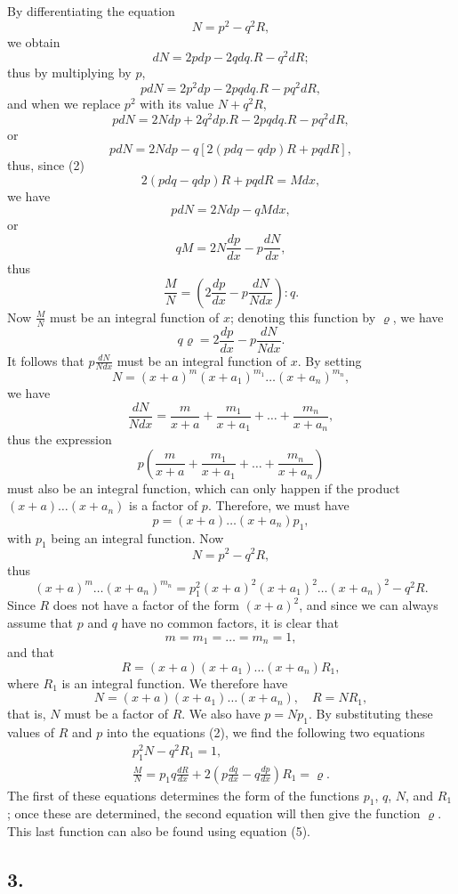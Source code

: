 \documentclass[oneside, 12 pt, leqno]{memoir}
\begin{document}
By differentiating the equation
\[N=p^2-q^2 R,\]
we obtain
\[d N=2 p d p-2 q d q. R-q^2 d R;\]
thus by multiplying by \(p\),
\[p d N=2 p^2 d p-2 p q d q. R- pq^2 d R,\]
and when we replace \(p^2\) with its value \(N+q^2 R\),
\[p d N=2 N d p+2 q^2 d p. R-2 p q d q. R-p q^2 d R,\]
or
\[p d N=2 N d p-q[2(p d q-q d p) R+p q d R],\]
thus, since (2)
\[2(p d q-q d p) R+p q d R=M d x,\]
we have
\[p d N=2 N d p-q M d x,\]
or
\[q M=2 N \frac{d p}{d x}-p \frac{d N}{d x},\]
thus
\[\tag{5}\frac{M}{N}=\left(2 \frac{d p}{d x}-p \frac{d N}{N d x}\right) : q.\]
Now \(\frac{M}{N}\) must be an integral function of \(x\); denoting this function by \(\varrho\), we have
\[q \varrho=2 \frac{d p}{d x}-p \frac{d N}{N d x}.\]
It follows that \(p \frac{d N}{N d x}\) must be an integral function of \(x\). By setting
\[N=(x+a)^m\left(x+a_1\right)^{m_1} \dots\left(x+a_n\right)^{m_n},\]
we have
\[\frac{d N}{N d x}=\frac{m}{x+a}+\frac{m_1}{x+a_1}+\dots+\frac{m_n}{x+a_n},\] 
thus the expression
\[p\left(\frac{m}{x+a}+\frac{m_1}{x+a_1}+\dots+\frac{m_n}{x+a_n}\right)\]
must also be an integral function, which can only happen if the product \((x+a) \dots\left(x+a_n\right)\) is a factor of \(p\). Therefore, we must have
\[p=(x+a) \dots\left(x+a_n\right) p_1,
\]
with \(p_1\) being an integral function. Now
\[N=p^2-q^2 R,\]
thus
\[(x+a)^m \dots\left(x+a_n\right)^{m_n}=p_1^2(x+a)^2\left(x+a_1\right)^2 \dots\left(x+a_n\right)^2-q^2 R.\]
Since \(R\) does not have a factor of the form \((x+a)^2\), and since we can always assume that \(p\) and \(q\) have no common factors, it is clear that
\[m=m_1=\dots=m_n=1, \]
and that
\[R=(x+a)\left(x+a_1\right) \dots\left(x+a_n\right) R_1,\]
where \(R_1\) is an integral function. We therefore have
\[N=(x+a)\left(x+a_1\right) \dots\left(x+a_n\right), \quad R=N R_1,\]
that is, \(N\) must be a factor of \(R\). We also have \(p=N p_1\). By substituting these values of \(R\) and \(p\) into the equations (2), we find the following two equations
\[\tag{6}\begin{gathered}
p_1^2 N-q^2 R_1=1, \\
\frac{M}{N}=p_1 q \frac{d R}{d x}+2\left(p \frac{d q}{d x}-q \frac{d p}{d x}\right) R_1=\varrho.
\end{gathered}\]
The first of these equations determines the form of the functions \(p_1\), \(q\), \(N\), and \(R_1\); once these are determined, the second equation will then give the function \(\varrho\). This last function can also be found using equation (5).

\subsection*{3.}
\end{document}
